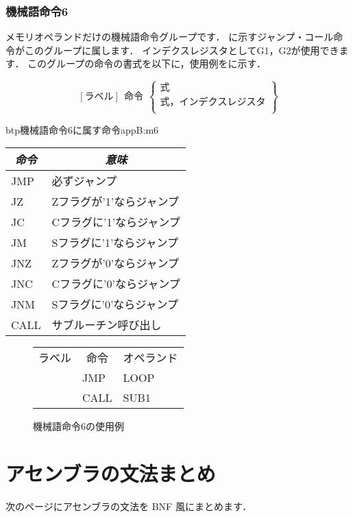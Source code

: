 \subsubsection{機械語命令6}
メモリオペランドだけの機械語命令グループです．
に示すジャンプ・コール命令がこのグループに属します．
インデクスレジスタとしてG1，G2が使用できます．
このグループの命令の書式を以下に，使用例をに示す．

{\small\[ %
[ラベル]~~命令~~\left\{
  \begin{array}{c}
   式 \\
   式，インデクスレジスタ \\
  \end{array}  
 \right\}
 \]}

\begin{mytable}{btp}{機械語命令6に属す命令}{appB:m6}
{\small\begin{tabular}{l|l}
\hline\hline
\multicolumn{1}{c|}{\it 命令} & \multicolumn{1}{c}{\it 意味} \\
\hline
JMP & 必ずジャンプ \\
JZ  & Zフラグが'1'ならジャンプ \\
JC  & Cフラグに'1'ならジャンプ \\
JM  & Sフラグに'1'ならジャンプ \\
JNZ & Zフラグが'0'ならジャンプ \\
JNC & Cフラグに'0'ならジャンプ \\
JNM & Sフラグに'0'ならジャンプ \\
CALL & サブルーチン呼び出し
\end{tabular}}
\end{mytable}

\begin{figure}[btp]
\begin{center}
{\tt\small\begin{tabular}{|l|l|l|}
\hline
\hline
\multicolumn{1}{|c|}{ラベル} & 
        \multicolumn{1}{c|}{命令} & \multicolumn{1}{c|}{オペランド} \\
  & JMP & LOOP \\
  & CALL & SUB1 \\
\hline
\end{tabular}}
\caption{機械語命令6の使用例}
\label{fig:appB:m6ex}
\end{center}
\end{figure}

\section{アセンブラの文法まとめ}
次のページにアセンブラの文法を BNF 風にまとめます．

